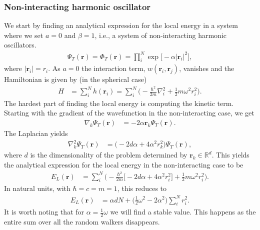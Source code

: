 \documentclass[
    a4paper, aps, twocolumn, floatfix, superscriptaddress]{revtex4-1}
\newcommand{\vf}{\mathbf}
\newcommand{\1}{\mathds{1}}
\newcommand{\half}{\frac{1}{2}}
\begin{document}
        \subsubsection{Non-interacting harmonic oscillator}
            We start by finding an analytical expression for the local energy in
            a system where we set $a = 0$ and $\beta = 1$, i.e., a system of
            non-interacting harmonic oscillators.
            \begin{align}
                \Psi_T(\vf{r})
                = \Phi_T(\vf{r})
                = \prod_i^N \exp\bigl[
                    -\alpha |\vf{r}_i|^2
                \bigr],
            \end{align}
            where $|\vf{r}_i| = r_i$. As $a = 0$ the interaction term,
            $w(\vf{r}_i, \vf{r}_j)$, vanishes and the Hamiltonian is given by
            (in the spherical case)
            \begin{align}
                H &= \sum_i^N h(\vf{r}_i)
                = \sum_i^N \Biggl(
                    -\frac{\hbar^2}{2m}\nabla_i^2
                    + \half m \omega^2 r_i^2
                \Biggr).
            \end{align}
            The hardest part of finding the local energy is computing the
            kinetic term. Starting with the gradient of the wavefunction in the
            non-interacting case, we get
            \begin{align}
                \nabla_k\Psi_T(\vf{r})
                &= -2\alpha \vf{r}_k\Psi_T(\vf{r}).
            \end{align}
            The Laplacian yields
            \begin{align}
                \nabla^2_k\Psi_T(\vf{r})
                &= \big(-2d\alpha + 4\alpha^2 r_k^2\bigr)\Psi_T(\vf{r}),
            \end{align}
            where $d$ is the dimensionality of the problem determined by
            $\vf{r}_k \in \mathbb{R}^d$. This yields the analytical expression
            for the local energy in the non-interacting case to be
            \begin{align}
                E_L(\vf{r})
                &=
                \sum_i^N
                \Biggl(
                    -\frac{\hbar^2}{2m}
                    \bigl[
                        -2d\alpha + 4\alpha^2 r_i^2
                    \bigr]
                    + \half m\omega^2 r_i^2
                \Biggr).
            \end{align}
            In natural units, with $\hbar = c = m = 1$, this reduces to
            \begin{align}
                E_L(\vf{r})
                &=
                \alpha dN
                + \biggl(
                    \half\omega^2
                    - 2\alpha^2
                \biggr)
                \sum_i^N r_i^2.
            \end{align}
            It is worth noting that for $\alpha = \half\omega$ we will find a
            stable value. This happens as the entire sum over all the random
            walkers disappears.
\end{document}
